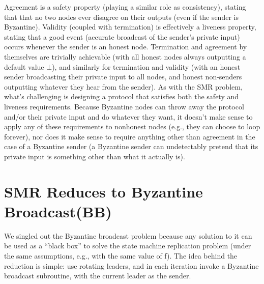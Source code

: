 Agreement is a safety property (playing a similar role as consistency), stating that that no
two nodes ever disagree on their outputs (even if the sender is Byzantine). Validity (coupled with termination) is effectively a liveness property, stating that a good event (accurate
broadcast of the sender’s private input) occurs whenever the sender is an honest node. Termination and agreement by themselves are trivially achievable (with all honest nodes always
outputting a default value $\bot$), and similarly for termination and validity (with an honest
sender broadcasting their private input to all nodes, and honest non-senders outputting
whatever they hear from the sender). As with the SMR problem, what’s challenging is
designing a protocol that satisfies both the safety and liveness requirements.
Because Byzantine nodes can throw away the protocol and/or their private input and
do whatever they want, it doesn’t make sense to apply any of these requirements to nonhonest nodes (e.g., they can choose to loop forever), nor does it make sense to require
anything other than agreement in the case of a Byzantine sender (a Byzantine sender can
undetectably pretend that its private input is something other than what it actually is).

\section{SMR Reduces to Byzantine Broadcast(BB)}
We singled out the Byzantine broadcast problem because any solution to it can be used as
a “black box” to solve the state machine replication problem (under the same assumptions,
e.g., with the same value of f). The idea behind the reduction is simple: use rotating leaders,
and in each iteration invoke a Byzantine broadcast subroutine, with the current leader as the
sender.

